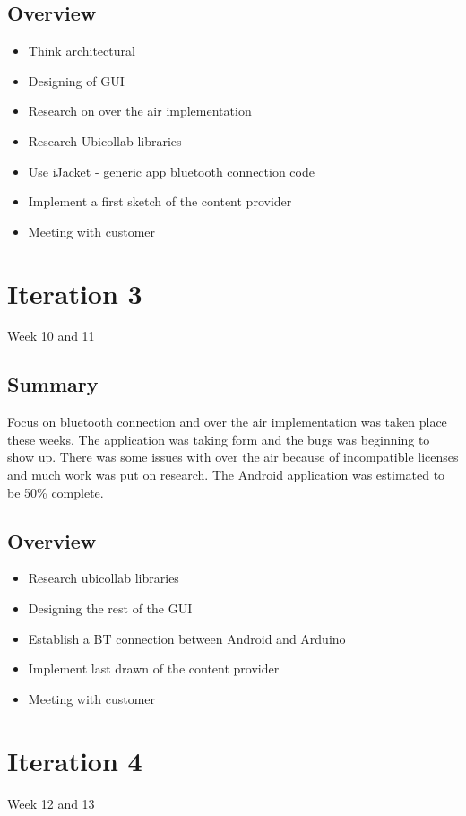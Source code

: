 \subsection{Overview}
\begin{itemize}
	\item{Think architectural}
	\item{Designing of GUI}
	\item{Research on over the air implementation}
	\item{Research Ubicollab libraries}
	\item{Use iJacket - generic app bluetooth connection code}
	\item{Implement a first sketch of the content provider}
	\item{Meeting with customer}
\end{itemize}

\section{Iteration 3}
Week 10 and 11
\subsection{Summary}
	Focus on bluetooth connection and over the air implementation was taken place these weeks. The application was taking form
	and the bugs was beginning to show up. There was some issues with over the air because of incompatible licenses and much work was
	put on research. The Android application was estimated to be 50\% complete.

\subsection{Overview}
\begin{itemize}
	\item{Research ubicollab libraries}
	\item{Designing the rest of the GUI}
	\item{Establish a BT connection between Android and Arduino}
	\item{Implement last drawn of the content provider}
	\item{Meeting with customer}
\end{itemize}

\section{Iteration 4}
Week 12 and 13
